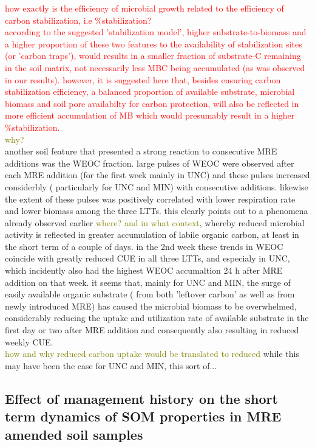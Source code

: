 \documentclass[12pt]{report}
\newcommand{\myRed}[1]{\textcolor{red}{#1}} %
\newcommand{\myGreen}[1]{\textcolor{olive}{#1}} %
\begin{document}
			 \myRed{how exactly is the efficiency of microbial growth related to the efficiency of carbon stabilization, i.e \%stabilization?\\
			 according to the suggested 'stabilization model', higher substrate-to-biomass and a higher proportion of these two features to the availability of stabilization sites (or 'carbon traps'), would results in a smaller fraction of substrate-C remaining in the soil matrix, not necessarily less MBC being accumulated (as was observed in our results). however, it is suggested here that, besides ensuring carbon stabilization efficiency, a balanced proportion of available substrate, microbial biomass and soil pore availabilty for carbon protection, will also be reflected in more efficient accumulation of MB which would presumably result in a higher \%stabilization.}\\
		 	 \myGreen{why?}\\
		 	 another soil feature that presented a strong reaction to consecutive MRE additions was the WEOC fraction. large pulses of WEOC were observed after each MRE addition (for the first week mainly in UNC) and these pulses increased considerbly ( particularly for UNC and MIN) with consecutive additions. likewise the extent of these pulses was positively correlated with lower respiration rate and lower biomass among the three LTTs. this clearly points out to a phenomena already observed earlier \myGreen{where? and in what context}, whereby reduced microbial activity is reflected in greater accumulation of labile organic carbon, at least in the short term of a couple of days. in the 2nd week these trends in WEOC coincide with greatly reduced CUE in all three LTTs, and especialy in UNC, which incidently also had the highest WEOC accumaltion 24 h after MRE addition on that week. it seems that, mainly for UNC and MIN, the surge of easily available organic substrate ( from both 'leftover carbon' as well as from newly introduced MRE) has caused the microbial biomass to be overwhelmed, considerably reducing the uptake and utilization rate of available substrate in the first day or two after MRE addition and consequently also resulting in reduced weekly CUE.\\
		 	 \myGreen{how and why reduced carbon uptake would be translated to reduced }
			  while this may have been the case for UNC and MIN, this sort of...
			  
	\subsection{Effect of management history on the short term dynamics of SOM properties in MRE amended soil samples} 
		
\end{document}
